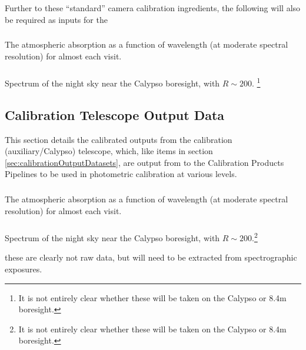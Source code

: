 Further to these ``standard'' camera calibration ingredients, the following will also be required as inputs for the 

\subsubsection{}\label{calypso:atmosphericAbsorption} The atmospheric absorption as a function of wavelength (at moderate spectral resolution) for almost each visit.


\subsubsection{}\label{calypso:nightSkySpectrum} Spectrum of the night sky near the Calypso boresight, with $R \sim 200$. \footnote{It is not entirely clear whether these will be taken on the Calypso or 8.4m	boresight.}






\subsection{Calibration Telescope Output Data}
\label{sec:calibrationTelescopeDatasets}
This section details the calibrated outputs from the calibration (auxiliary/Calypso) telescope, which, like items in section \ref{sec:calibrationOutputDatasets}, are output from to the Calibration Products Pipelines to be used in photometric calibration at various levels.


\subsubsection{}\label{calypso:atmosphericAbsorption}
The atmospheric absorption as a function of wavelength (at moderate spectral resolution) for almost each visit.
 
\subsubsection{}\label{calypso:nightSkySpectrum}
Spectrum of the night sky near the Calypso boresight, with $R \sim 200$.\footnote{It is not entirely clear whether these will be taken on the Calypso or 8.4m boresight.}

\Nb these are clearly not raw data, but will need to be extracted from spectrographic exposures.



